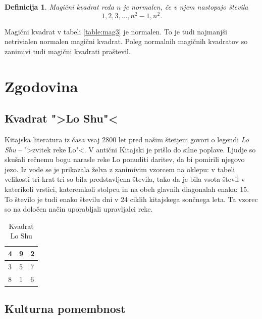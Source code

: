 \documentclass[a4paper,12pt]{article}
\newtheorem{definicija}[izrek]{Definicija}
\begin{document}
\begin{definicija}
   Magični kvadrat reda $n$ je \emph{normalen}, če v njem nastopajo števila
   \begin{equation}
      \label{eq:numbers} 
      1, 2, 3, \ldots, n^2-1, n^2.
   \end{equation}
\end{definicija}

Magični kvadrat v tabeli \ref{table:mag3} je normalen.
To je tudi najmanjši netrivialen normalen magični kvadrat.
Poleg normalnih magičnih kvadratov so zanimivi tudi magični kvadrati praštevil.


\section{Zgodovina}

\subsection{Kvadrat ">Lo Shu"<}

Kitajska literatura iz časa vsaj 2800 let pred našim štetjem govori o legendi
\emph{Lo Shu} -- ">zvitek reke Lo"<. V antični Kitajski je prišlo do
silne poplave. Ljudje so skušali rečnemu bogu narasle reke Lo ponuditi daritev,
da bi pomirili njegovo jezo. Iz vode se je prikazala želva z zanimivim vzorcem
na oklepu: v tabeli velikosti tri krat tri so bila predstavljena števila, tako
da je bila vsota števil v katerikoli vrstici, kateremkoli stolpcu in na obeh
glavnih diagonalah enaka: 15. To število je tudi enako številu dni v 24 ciklih
kitajskega sončnega leta. Ta vzorec so na določen način uporabljali upravljalci
reke.


\begin{table}[ht!]
   \large
   \centering
   \caption{Kvadrat Lo Shu}
   \begin{tabular}{|l|l|l|}
      \hline
      4 & 9 & 2 \\\hline
      3 & 5 & 7 \\\hline
      8 & 1 & 6 \\\hline
   \end{tabular}
   \label{table:loshu}
\end{table}
%


\subsection{Kulturna pomembnost}
\end{document}
